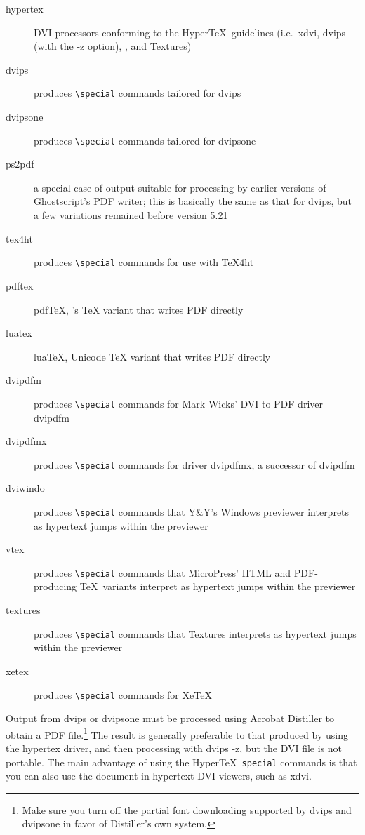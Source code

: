 \documentclass{article}
\newcommand{\bs}{\symbol{'134}}%
\newcommand{\ci}[1]{\texttt{\bs#1}}
\begin{document}
\begin{description}
\item[hypertex] DVI processors conforming to the Hyper\TeX\ guidelines (i.e.\ \textsf{xdvi}, \textsf{dvips} (with
the \textsf{-z} option), \textsf{}, and \textsf{Textures})
\item[dvips] produces \verb|\special| commands tailored for \textsf{dvips}
\item[dvipsone] produces \verb|\special| commands tailored for \textsf{dvipsone}
\item[ps2pdf] a special case of output suitable for processing by earlier versions of Ghost\-script's
PDF writer; this is basically the same as that for \textsf{dvips}, but a few variations remained before version 5.21
\item[tex4ht] produces \verb|\special| commands for use with \textsf{\TeX4ht}
\item[pdftex] pdf\TeX, 's \TeX{} variant that writes PDF directly
\item[luatex] lua\TeX, Unicode \TeX{} variant that writes PDF directly
\item[dvipdfm] produces \verb|\special| commands for Mark Wicks' DVI to PDF driver \textsf{dvipdfm}
\item[dvipdfmx] produces \verb|\special| commands for driver
     \textsf{dvipdfmx}, a successor of \textsf{dvipdfm}
\item[dviwindo] produces \verb|\special| commands that Y\&Y's Windows previewer interprets as hypertext jumps within the previewer
\item[vtex] produces \verb|\special| commands that MicroPress' HTML and
     PDF-producing \TeX\ variants interpret as hypertext jumps within the
     previewer
\item[textures] produces \verb|\special| commands that \textsf{Textures} interprets as hypertext jumps within the previewer
\item[xetex] produces \verb|\special| commands for Xe\TeX{}
\end{description}

Output from \textsf{dvips} or \textsf{dvipsone} must be processed using
Acrobat Distiller to obtain a PDF file.\footnote{Make sure you turn off
the partial font downloading supported by \textsf{dvips} and
\textsf{dvipsone} in favor of Distiller's own system.} The result is
generally preferable to that produced by using the \textsf{hypertex}
driver, and then processing with \textsf{dvips -z}, but the DVI file is
not portable. The main advantage of using the Hyper\TeX\ \ci{special}
commands is that you can also use the document in hypertext DVI viewers,
such as \textsf{xdvi}.
\end{document}

